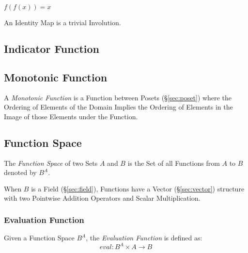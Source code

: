 $f(f(x)) = x$

An Identity Map is a trivial Involution.



\subsection{Indicator Function}\label{sec:indicator_function}

\subsection{Monotonic Function}\label{sec:monotonic}

A \emph{Monotonic Function} is a Function between Posets
(\S\ref{sec:poset}) where the Ordering of Elements of the Domain
Implies the Ordering of Elements in the Image of those Elements under
the Function.



\subsection{Function Space}\label{sec:function_space}

The \emph{Function Space} of two Sets $A$ and $B$ is the Set of all
Functions from $A$ to $B$ denoted by $B^A$.

When $B$ is a Field (\S\ref{sec:field}), Functions have a Vector
(\S\ref{sec:vector}) structure with two Pointwise Addition Operators
and Scalar Multiplication. %



\subsubsection{Evaluation Function}\label{sec:evaluation_function}

Given a Function Space $B^A$, the \emph{Evaluation Function} is
defined as:
\[
  eval : B^A \times A \rightarrow B
\]



